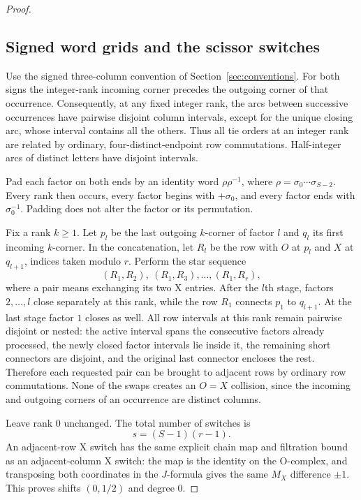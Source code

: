 \documentclass[11pt,a4paper]{article}
\theoremstyle{remark}
\begin{document}
\begin{proof}
\subsection{Signed word grids and the scissor switches}

Use the signed three-column convention of Section~\ref{sec:conventions}.  For both signs the
integer-rank incoming corner precedes the outgoing corner of that occurrence.
Consequently, at any fixed integer rank, the arcs between successive
occurrences have pairwise disjoint column intervals, except for the unique
closing arc, whose interval contains all the others.  Thus all tie orders at
an integer rank are related by ordinary, four-distinct-endpoint row
commutations.  Half-integer arcs of distinct letters have disjoint intervals.

Pad each factor on both ends by an identity word $\rho\rho^{-1}$, where
$\rho=\sigma_0\cdots\sigma_{S-2}$.  Every rank then occurs, every factor
begins with $+\sigma_0$, and every factor ends with $\sigma_0^{-1}$.
Padding does not alter the factor or its permutation.

Fix a rank $k\geq1$.  Let $p_l$ be the last outgoing $k$-corner of factor $l$
and $q_l$ its first incoming $k$-corner.  In the concatenation, let $R_l$ be
the row with $O$ at $p_l$ and $X$ at $q_{l+1}$, indices taken modulo $r$.
Perform the star sequence
\[
 (R_1,R_2),\ (R_1,R_3),\ldots,(R_1,R_r),
\]
where a pair means exchanging its two X entries.  After the $l$th stage,
factors $2,\ldots,l$ close separately at this rank, while the row $R_1$
connects $p_1$ to $q_{l+1}$.  At the last stage factor $1$ closes as well.
All row intervals at this rank remain pairwise disjoint or nested: the
active interval spans the consecutive factors already processed, the newly
closed factor intervals lie inside it, the remaining short connectors are
disjoint, and the original last connector encloses the rest.  Therefore each
requested pair can be brought to adjacent rows by ordinary row commutations.
None of the swaps creates an $O=X$ collision, since the incoming and outgoing
corners of an occurrence are distinct columns.

Leave rank $0$ unchanged.  The total number of switches is
\[
 s=(S-1)(r-1).
\]
An adjacent-row X switch has the same explicit chain map and filtration bound
as an adjacent-column X switch: the map is the identity on the O-complex,
and transposing both coordinates in the $J$-formula gives the same
$M_X$ difference $\pm1$.  This proves shifts $(0,1/2)$ and degree $0$.



\end{proof}
\end{document}
